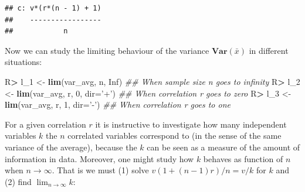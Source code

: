 \documentclass[10pt,]{article}
\newenvironment{Shaded}{\begin{snugshade}}{\end{snugshade}}
\newcommand{\CommentTok}[1]{\textcolor[rgb]{0.56,0.35,0.01}{\textit{#1}}}
\newcommand{\DataTypeTok}[1]{\textcolor[rgb]{0.13,0.29,0.53}{#1}}
\newcommand{\DecValTok}[1]{\textcolor[rgb]{0.00,0.00,0.81}{#1}}
\newcommand{\KeywordTok}[1]{\textcolor[rgb]{0.13,0.29,0.53}{\textbf{#1}}}
\newcommand{\NormalTok}[1]{#1}
\newcommand{\OperatorTok}[1]{\textcolor[rgb]{0.81,0.36,0.00}{\textbf{#1}}}
\newcommand{\OtherTok}[1]{\textcolor[rgb]{0.56,0.35,0.01}{#1}}
\newcommand{\StringTok}[1]{\textcolor[rgb]{0.31,0.60,0.02}{#1}}
\begin{document}
\begin{verbatim}
## c: v*(r*(n - 1) + 1)
##    -----------------
##            n
\end{verbatim}

Now we can study the limiting behaviour of the variance
\(\mathbf{Var}(\bar x)\) in different situations:

\begin{Shaded}
\begin{Highlighting}[]
\NormalTok{R}\OperatorTok{>}\StringTok{ }\NormalTok{l_}\DecValTok{1}\NormalTok{ <-}\StringTok{ }\KeywordTok{lim}\NormalTok{(var_avg, n, }\OtherTok{Inf}\NormalTok{)         }\CommentTok{## When sample size n goes to infinity}
\NormalTok{R}\OperatorTok{>}\StringTok{ }\NormalTok{l_}\DecValTok{2}\NormalTok{ <-}\StringTok{ }\KeywordTok{lim}\NormalTok{(var_avg, r, }\DecValTok{0}\NormalTok{, }\DataTypeTok{dir=}\StringTok{'+'}\NormalTok{)  }\CommentTok{## When correlation r goes to zero}
\NormalTok{R}\OperatorTok{>}\StringTok{ }\NormalTok{l_}\DecValTok{3}\NormalTok{ <-}\StringTok{ }\KeywordTok{lim}\NormalTok{(var_avg, r, }\DecValTok{1}\NormalTok{, }\DataTypeTok{dir=}\StringTok{'-'}\NormalTok{)  }\CommentTok{## When correlation r goes to one}
\end{Highlighting}
\end{Shaded}

For a given correlation \(r\) it is instructive to investigate how many
independent variables \(k\) the \(n\) correlated variables correspond to
(in the sense of the same variance of the average), because the \(k\)
can be seen as a measure of the amount of information in data. Moreover,
one might study how \(k\) behaves as function of \(n\) when
\(n \rightarrow \infty\). That is we must (1) solve
\(v (1 + (n-1)r)/n = v/k\) for \(k\) and (2) find
\(\lim_{n\rightarrow\infty} k\):

\begin{Shaded}
\end{Shaded}
\end{document}
